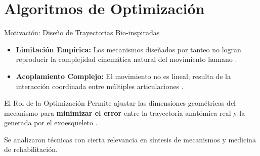 \documentclass[xcolor={table,dvipsnames}]{beamer}
\begin{document}
\section{Algoritmos de Optimizaci\'on}

\begin{frame}{Motivaci\'on: Dise\~no de Trayectorias Bio-inspiradas}
    \begin{itemize}
        \item \textbf{Limitaci\'on Emp\'irica:} Los mecanismos dise\~nados por tanteo no logran reproducir la complejidad cinem\'atica natural del movimiento humano \cite{ebrahimi2015efficient}.
        \item \textbf{Acoplamiento Complejo:} El movimiento no es lineal; resulta de la interacci\'on coordinada entre m\'ultiples articulaciones \cite{Cabrera2002}.
    \end{itemize}

    \begin{block}{El Rol de la Optimizaci\'on}
        Permite ajustar las dimensiones geom\'etricas del mecanismo para \textbf{minimizar el error} entre la trayectoria anat\'omica real y la generada por el exoesqueleto \cite{deb2012optimization}.
    \end{block}

    \vspace{0.3cm}
    Se analizaron t\'ecnicas con cierta relevancia en s\'intesis de mecanismos y medicina de rehabilitaci\'on.
\end{frame}
\end{document}
